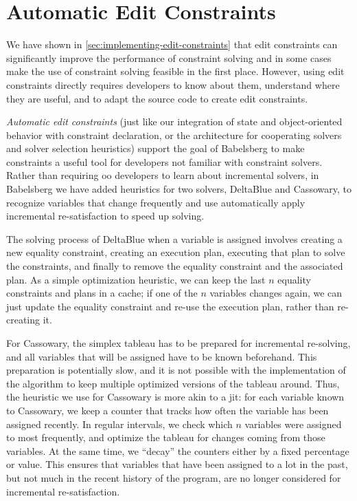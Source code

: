 \documentclass[numbers]{sigplanconf}
\newcommand{\ac}[1]{\gls{#1}}
\begin{document}
\section{Automatic Edit Constraints}
We have shown in \autoref{sec:implementing-edit-constraints} that edit
constraints can significantly improve the performance of constraint solving and
in some cases make the use of constraint solving feasible in the first
place. However, using edit constraints directly requires developers to know
about them, understand where they are useful, and to adapt the source code to
create edit constraints.

\emph{Automatic edit constraints} (just like our integration of state and
object-oriented behavior with constraint declaration, or the architecture for
cooperating solvers and solver selection heuristics) support the goal of
Babelsberg to make constraints a useful tool for developers not familiar with
constraint solvers. Rather than requiring \ac{oo} developers to learn about
incremental solvers, in Babelsberg we have added heuristics for two solvers,
DeltaBlue and Cassowary, to recognize variables that change frequently and use
automatically apply incremental re-satisfaction to speed up solving.

The solving process of DeltaBlue when a variable is assigned involves creating a
new equality constraint, creating an execution plan, executing that plan to
solve the constraints, and finally to remove the equality constraint and the
associated plan. As a simple optimization heuristic, we can keep the last $n$
equality constraints and plans in a cache; if one of the $n$ variables changes
again, we can just update the equality constraint and re-use the execution plan,
rather than re-creating it.

For Cassowary, the simplex tableau has to be prepared for incremental
re-solving, and all variables that will be assigned have to be known
beforehand. This preparation is potentially slow, and it is not possible with
the implementation of the algorithm to keep multiple optimized versions of the
tableau around. Thus, the heuristic we use for Cassowary is more akin to a
\ac{jit}: for each variable known to Cassowary, we keep a counter that tracks
how often the variable has been assigned recently. In regular intervals, we
check which $n$ variables were assigned to most frequently, and optimize the
tableau for changes coming from those variables. At the same time, we ``decay''
the counters either by a fixed percentage or value. This ensures that variables
that have been assigned to a lot in the past, but not much in the recent history
of the program, are no longer considered for incremental re-satisfaction.
\end{document}
